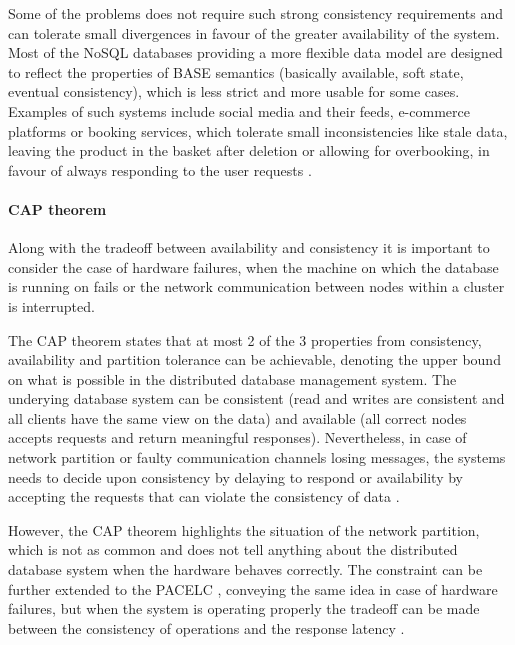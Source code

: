 Some of the problems does not require such strong consistency requirements and can tolerate small divergences in favour of the greater availability of the system. Most of the NoSQL databases providing a more flexible data model are designed to reflect the properties of BASE semantics (basically available, soft state, eventual consistency), which is less strict and more usable for some cases. Examples of such systems include social media and their feeds, e-commerce platforms or booking services, which tolerate small inconsistencies like stale data, leaving the product in the basket after deletion or allowing for overbooking, in favour of always responding to the user requests \cite{NoSQLDatabaseSystemsSurveyDecisionGuidance}.

\paragraph{CAP theorem}

Along with the tradeoff between availability and consistency it is important to consider the case of hardware failures, when the machine on which the database is running on fails or the network communication between nodes within a cluster is interrupted. 

The CAP theorem \cite{CAPTheorem} states that at most 2 of the 3 properties from consistency, availability and partition tolerance can be achievable, denoting the upper bound on what is possible in the distributed database management system. The underying database system can be consistent (read and writes are consistent and all clients have the same view on the data) and available (all correct nodes accepts requests and return meaningful responses). Nevertheless, in case of network partition or faulty communication channels losing messages, the systems needs to decide upon consistency by delaying to respond or availability by accepting the requests that can violate the consistency of data \cite{PerspectivesOnArchitectureEvolution}.

However, the CAP theorem highlights the situation of the network partition, which is not as common and does not tell anything about the distributed database system when the hardware behaves correctly. The constraint can be further extended to the PACELC \cite{PACELC}, conveying the same idea in case of hardware failures, but when the system is operating properly the tradeoff can be made between the consistency of operations and the response latency \cite{NoSQLDatabaseSystemsSurveyDecisionGuidance}.

